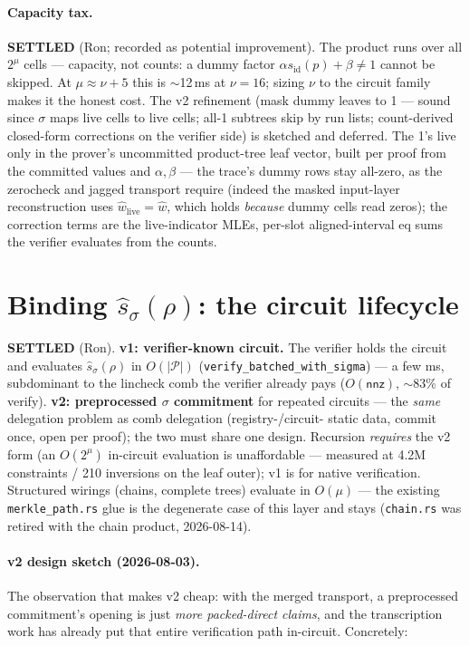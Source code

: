 \documentclass[11pt]{article}
\newcommand{\nnz}{\mathsf{nnz}}
\newcommand{\code}[1]{\texttt{#1}}
\newcommand{\sid}{s_{\mathrm{id}}}
\newcommand{\cells}{\mathcal{P}}
\newcommand{\settled}[1]{\medskip\noindent\textbf{SETTLED} (#1).\xspace}
\theoremstyle{definition}
\begin{document}
\paragraph{Capacity tax.} \settled{Ron; recorded as potential
improvement} The product runs over all $2^\mu$ cells --- capacity, not
counts: a dummy factor $\alpha\sid(p) + \beta \ne 1$ cannot be skipped. At
$\mu \approx \nu + 5$ this is $\sim$12\,ms at $\nu = 16$; sizing $\nu$ to
the circuit family makes it the honest cost. The v2 refinement (mask dummy
leaves to 1 --- sound since $\sigma$ maps live cells to live cells; all-1
subtrees skip by run lists; count-derived closed-form corrections on the
verifier side) is sketched and deferred. The 1's live only in the
prover's uncommitted product-tree leaf vector, built per proof from the
committed values and $\alpha, \beta$ --- the trace's dummy rows stay
all-zero, as the zerocheck and jagged transport require (indeed the
masked input-layer reconstruction uses $\hat w_{\mathrm{live}} = \hat w$,
which holds \emph{because} dummy cells read zeros); the correction terms
are the $\mathrm{live}$-indicator MLEs, per-slot aligned-interval eq
sums the verifier evaluates from the counts.

\section{Binding \texorpdfstring{$\hat s_\sigma(\rho)$}{s-sigma}: the
circuit lifecycle}\label{sec:sigma}

\settled{Ron} \textbf{v1: verifier-known circuit.} The verifier holds the
circuit and evaluates $\hat s_\sigma(\rho)$ in $O(|\cells|)$
(\code{verify\_batched\_with\_sigma}) --- a few ms, subdominant to the
lincheck comb the verifier already pays ($O(\nnz)$, $\sim$83\% of verify).
\textbf{v2: preprocessed $\sigma$ commitment} for repeated circuits ---
the \emph{same} delegation problem as comb delegation (registry-/circuit-
static data, commit once, open per proof); the two must share one design.
Recursion \emph{requires} the v2 form (an $O(2^\mu)$ in-circuit evaluation
is unaffordable --- measured at 4.2M constraints / 210 inversions on the
leaf outer); v1 is for native verification. Structured wirings
(chains, complete trees) evaluate in $O(\mu)$ --- the existing
\code{merkle\_path.rs} glue is the degenerate case of this
layer and stays (\code{chain.rs} was retired with the chain product,
2026-08-14).

\paragraph{v2 design sketch (2026-08-03).} The observation that makes v2
cheap: with the merged transport, a preprocessed commitment's opening is
just \emph{more packed-direct claims}, and the transcription work has
already put that entire verification path in-circuit. Concretely:
\end{document}
